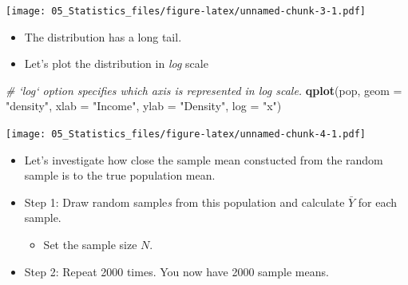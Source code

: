 \documentclass[]{book}
\newenvironment{Shaded}{\begin{snugshade}}{\end{snugshade}}
\newcommand{\KeywordTok}[1]{\textcolor[rgb]{0.13,0.29,0.53}{\textbf{#1}}}
\newcommand{\DataTypeTok}[1]{\textcolor[rgb]{0.13,0.29,0.53}{#1}}
\newcommand{\StringTok}[1]{\textcolor[rgb]{0.31,0.60,0.02}{#1}}
\newcommand{\CommentTok}[1]{\textcolor[rgb]{0.56,0.35,0.01}{\textit{#1}}}
\newcommand{\NormalTok}[1]{#1}
\providecommand{\tightlist}{%
  \setlength{\itemsep}{0pt}\setlength{\parskip}{0pt}}
\begin{document}
\texttt{[image: 05\_Statistics\_files/figure-latex/unnamed-chunk-3-1.pdf]}

\begin{itemize}
\tightlist
\item
  The distribution has a long tail.
\item
  Let's plot the distribution in \emph{log} scale
\end{itemize}

\begin{Shaded}
\begin{Highlighting}[]
\CommentTok{# `log` option specifies which axis is represented in log scale.}
\KeywordTok{qplot}\NormalTok{(pop, }\DataTypeTok{geom =} \StringTok{"density"}\NormalTok{, }
      \DataTypeTok{xlab =} \StringTok{"Income"}\NormalTok{,}
      \DataTypeTok{ylab =} \StringTok{"Density"}\NormalTok{,}
      \DataTypeTok{log =} \StringTok{"x"}\NormalTok{)}
\end{Highlighting}
\end{Shaded}

\texttt{[image: 05\_Statistics\_files/figure-latex/unnamed-chunk-4-1.pdf]}

\begin{itemize}
\tightlist
\item
  Let's investigate how close the sample mean constucted from the random
  sample is to the true population mean.
\item
  Step 1: Draw random sample\emph{s} from this population and calculate
  \(\bar{Y}\) for each sample.

  \begin{itemize}
  \tightlist
  \item
    Set the sample size \(N\).
  \end{itemize}
\item
  Step 2: Repeat 2000 times. You now have 2000 sample means.
\end{itemize}
\end{document}
